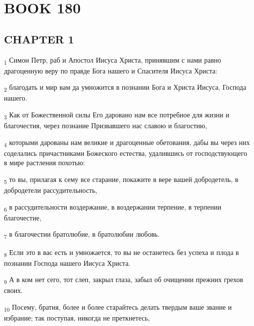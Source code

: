 \section{BOOK 180}
\subsection{CHAPTER 1}
\begin{tcolorbox}
\textsubscript{1} Симон Петр, раб и Апостол Иисуса Христа, принявшим с нами равно драгоценную веру по правде Бога нашего и Спасителя Иисуса Христа:
\end{tcolorbox}
\begin{tcolorbox}
\textsubscript{2} благодать и мир вам да умножится в познании Бога и Христа Иисуса, Господа нашего.
\end{tcolorbox}
\begin{tcolorbox}
\textsubscript{3} Как от Божественной силы Его даровано нам все потребное для жизни и благочестия, через познание Призвавшего нас славою и благостию,
\end{tcolorbox}
\begin{tcolorbox}
\textsubscript{4} которыми дарованы нам великие и драгоценные обетования, дабы вы через них соделались причастниками Божеского естества, удалившись от господствующего в мире растления похотью:
\end{tcolorbox}
\begin{tcolorbox}
\textsubscript{5} то вы, прилагая к сему все старание, покажите в вере вашей добродетель, в добродетели рассудительность,
\end{tcolorbox}
\begin{tcolorbox}
\textsubscript{6} в рассудительности воздержание, в воздержании терпение, в терпении благочестие,
\end{tcolorbox}
\begin{tcolorbox}
\textsubscript{7} в благочестии братолюбие, в братолюбии любовь.
\end{tcolorbox}
\begin{tcolorbox}
\textsubscript{8} Если это в вас есть и умножается, то вы не останетесь без успеха и плода в познании Господа нашего Иисуса Христа.
\end{tcolorbox}
\begin{tcolorbox}
\textsubscript{9} А в ком нет сего, тот слеп, закрыл глаза, забыл об очищении прежних грехов своих.
\end{tcolorbox}
\begin{tcolorbox}
\textsubscript{10} Посему, братия, более и более старайтесь делать твердым ваше звание и избрание; так поступая, никогда не преткнетесь,
\end{tcolorbox}
